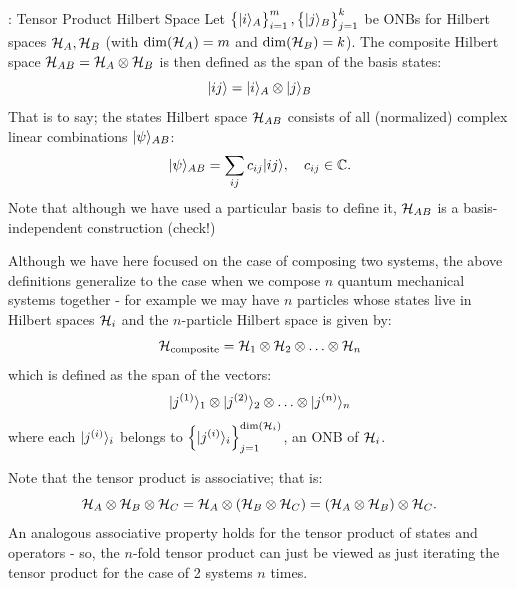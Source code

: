 \begin{defbox}{: Tensor Product Hilbert Space}
    Let $\set{\lvert i \rangle_A}_{i=1}^m, \set{\lvert j \rangle_B}_{j=1}^k$ be ONBs for Hilbert spaces $\mathcal{H}_A, \mathcal{H}_B$ (with $\dim(\mathcal{H}_A) = m$ and $\dim(\mathcal{H}_B) = k$). The composite Hilbert space $\mathcal{H}_{AB} = \mathcal{H}_A \otimes \mathcal{H}_B$ is then defined as the span of the basis states:
    \begin{equation}
        \lvert ij \rangle = \lvert i \rangle_A \otimes \lvert j \rangle_B
    \end{equation}
    That is to say; the states Hilbert space $\mathcal{H}_{AB}$ consists of all (normalized) complex linear combinations $\lvert \psi \rangle_{AB}$:
    \begin{equation}
        \lvert \psi \rangle_{AB} = \sum_{ij}c_{ij}\lvert ij \rangle, \quad c_{ij} \in \mathbb{C}.
    \end{equation}
    Note that although we have used a particular basis to define it, $\mathcal{H}_{AB}$ is a basis-independent construction (check!) 
\end{defbox}

Although we have here focused on the case of composing two systems, the above definitions generalize to the case when we compose $n$ quantum mechanical systems together - for example we may have $n$ particles whose states live in Hilbert spaces $\mathcal{H}_i$ and the $n$-particle Hilbert space is given by:
\begin{equation}
    \mathcal{H}_{\text{composite}} = \mathcal{H}_1 \otimes \mathcal{H}_2 \otimes \ldots \otimes \mathcal{H}_n
\end{equation}
which is defined as the span of the vectors:
\begin{equation}\label{eq-productstatebasis}
    \lvert j^{(1)} \rangle_1 \otimes \lvert j^{(2)} \rangle_2 \otimes \ldots \otimes \lvert j^{(n)} \rangle_n
\end{equation}
where each $\lvert j^{(i)} \rangle_i$ belongs to $\set{\lvert j^{(i)} \rangle_i}_{j=1}^{\dim(\mathcal{H}_i)}$, an ONB of $\mathcal{H}_i$.

Note that the tensor product is associative; that is:
\begin{equation}
    \mathcal{H}_A \otimes \mathcal{H}_B \otimes \mathcal{H}_C = \mathcal{H}_A \otimes (\mathcal{H}_B \otimes \mathcal{H}_C) = (\mathcal{H}_A \otimes \mathcal{H}_B) \otimes \mathcal{H}_C.
\end{equation}
An analogous associative property holds for the tensor product of states and operators - so, the $n$-fold tensor product can just be viewed as just iterating the tensor product for the case of 2 systems $n$ times.

